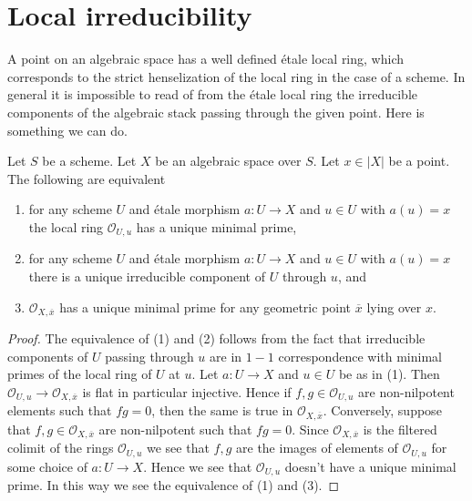 \section{Local irreducibility}
\label{section-irreducible-local-ring}

\noindent
A point on an algebraic space has a well defined \'etale local ring, which
corresponds to the strict henselization of the local ring in the case of a
scheme. In general it is impossible to read of from the \'etale local ring
the irreducible components of the algebraic stack passing through the given
point. Here is something we can do.

\begin{lemma}
\label{lemma-irreducible-local-ring}
Let $S$ be a scheme.
Let $X$ be an algebraic space over $S$.
Let $x \in |X|$ be a point.
The following are equivalent
\begin{enumerate}
\item for any scheme $U$ and \'etale morphism $a : U \to X$ and
$u \in U$ with $a(u) = x$ the local ring $\mathcal{O}_{U, u}$ has a
unique minimal prime,
\item for any scheme $U$ and \'etale morphism $a : U \to X$ and
$u \in U$ with $a(u) = x$ there is a unique irreducible component of $U$
through $u$, and
\item $\mathcal{O}_{X, \overline{x}}$ has a unique minimal prime
for any geometric point $\overline{x}$ lying over $x$.
\end{enumerate}
\end{lemma}

\begin{proof}
The equivalence of (1) and (2) follows from the fact that irreducible
components of $U$ passing through $u$ are in $1-1$ correspondence with
minimal primes of the local ring of $U$ at $u$. Let $a : U \to X$ and
$u \in U$ be as in (1). Then
$\mathcal{O}_{U, u} \to \mathcal{O}_{X, \overline{x}}$
is flat in particular injective. Hence if $f, g \in \mathcal{O}_{U, u}$
are non-nilpotent elements such that $fg = 0$, then the same is true in
$\mathcal{O}_{X, \overline{x}}$. Conversely, suppose that
$f, g \in \mathcal{O}_{X, \overline{x}}$ are non-nilpotent such that
$fg = 0$. Since $\mathcal{O}_{X, \overline{x}}$ is the filtered colimit
of the rings $\mathcal{O}_{U, u}$ we see that $f, g$ are the images
of elements of $\mathcal{O}_{U, u}$ for some choice of $a : U \to X$.
Hence we see that $\mathcal{O}_{U, u}$ doesn't have a unique minimal prime.
In this way we see the equivalence of (1) and (3).
\end{proof}

